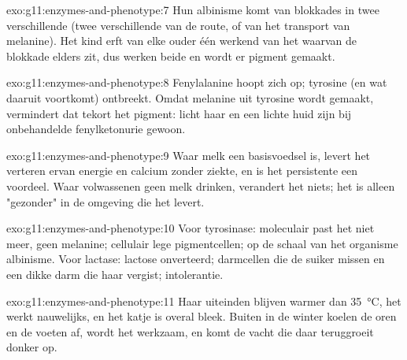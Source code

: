 \begin{solution}{exo:g11:enzymes-and-phenotype:7}
Hun albinisme komt van blokkades in twee verschillende  (twee
verschillende  van de route, of van het transport van melanine).
Het kind erft van elke ouder één werkend  van het  waarvan de
blokkade elders zit, dus werken beide  en wordt er pigment gemaakt.
\end{solution}

\begin{solution}{exo:g11:enzymes-and-phenotype:8}
Fenylalanine hoopt zich op; tyrosine (en wat daaruit voortkomt) ontbreekt.
Omdat melanine uit tyrosine wordt gemaakt, vermindert dat tekort het
pigment: licht haar en een lichte huid zijn bij onbehandelde
fenylketonurie gewoon.
\end{solution}

\begin{solution}{exo:g11:enzymes-and-phenotype:9}
Waar melk een basisvoedsel is, levert het verteren ervan energie en
calcium zonder ziekte, en is het persistente  een voordeel. Waar
volwassenen geen melk drinken, verandert het  niets; het is alleen
"gezonder" in de omgeving die het  levert.
\end{solution}

\begin{solution}{exo:g11:enzymes-and-phenotype:10}
Voor tyrosinase: moleculair past het  niet meer, geen melanine;
cellulair lege pigmentcellen; op de schaal van het organisme albinisme.
Voor lactase: lactose onverteerd; darmcellen die de suiker missen en een
dikke darm die haar vergist; intolerantie.
\end{solution}

\begin{solution}{exo:g11:enzymes-and-phenotype:11}
Haar uiteinden blijven warmer dan \qty{35}{\celsius}, het  werkt
nauwelijks, en het katje is overal bleek. Buiten in de winter koelen de
oren en de voeten af, wordt het  werkzaam, en komt de vacht die daar
teruggroeit donker op.
\end{solution}

